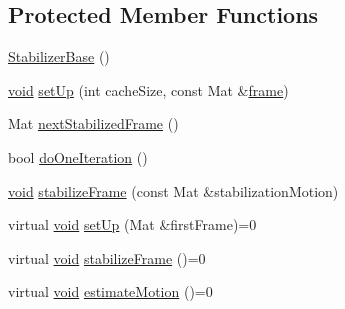 \subsection*{Protected Member Functions}
\begin{DoxyCompactItemize}
\item 
\hyperlink{classcv_1_1videostab_1_1StabilizerBase_aac79382ab3f87247ddc01fe0aa86ea64}{Stabilizer\-Base} ()
\item 
\hyperlink{legacy_8hpp_a8bb47f092d473522721002c86c13b94e}{void} \hyperlink{classcv_1_1videostab_1_1StabilizerBase_a29b80c78971533aff06706ea0e39f9da}{set\-Up} (int cache\-Size, const Mat \&\hyperlink{core__c_8h_a0430deaafd9043e478f306e33961299d}{frame})
\item 
Mat \hyperlink{classcv_1_1videostab_1_1StabilizerBase_a59ffdca7516042b0553a43c7b3cdcf74}{next\-Stabilized\-Frame} ()
\item 
bool \hyperlink{classcv_1_1videostab_1_1StabilizerBase_ade2bda91481dab757bf2ffe3f4f27465}{do\-One\-Iteration} ()
\item 
\hyperlink{legacy_8hpp_a8bb47f092d473522721002c86c13b94e}{void} \hyperlink{classcv_1_1videostab_1_1StabilizerBase_a71ad680c263ac8fdeab8912e8ce92f5e}{stabilize\-Frame} (const Mat \&stabilization\-Motion)
\item 
virtual \hyperlink{legacy_8hpp_a8bb47f092d473522721002c86c13b94e}{void} \hyperlink{classcv_1_1videostab_1_1StabilizerBase_a803f9615bc3a60c35b257f3f656a960e}{set\-Up} (Mat \&first\-Frame)=0
\item 
virtual \hyperlink{legacy_8hpp_a8bb47f092d473522721002c86c13b94e}{void} \hyperlink{classcv_1_1videostab_1_1StabilizerBase_a7b875111767893d71f7e8b615746a76d}{stabilize\-Frame} ()=0
\item 
virtual \hyperlink{legacy_8hpp_a8bb47f092d473522721002c86c13b94e}{void} \hyperlink{classcv_1_1videostab_1_1StabilizerBase_a16c6ba6b4f7f8d57525ff17e62322549}{estimate\-Motion} ()=0
\end{DoxyCompactItemize}
